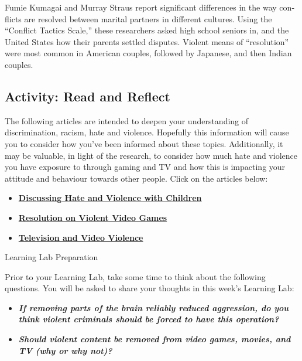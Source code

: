 \documentclass[
]{book}
\providecommand{\tightlist}{%
  \setlength{\itemsep}{0pt}\setlength{\parskip}{0pt}}
\begin{document}
Fumie Kumagai and Murray Straus report significant differences in the way con­flicts are resolved between marital partners in different cultures. Using the ``Conflict Tactics Scale,'' these researchers asked high school seniors in, and the United States how their parents settled disputes. Violent means of ``resolution'' were most common in American couples, followed by Japanese, and then Indian couples.

\hypertarget{activity-read-and-reflect-9}{%
\subsection*{Activity: Read and Reflect}\label{activity-read-and-reflect-9}}

\begin{reflect}
The following articles are intended to deepen your understanding of discrimination, racism, hate and violence. Hopefully this information will cause you to consider how you've been informed about these topics. Additionally, it may be valuable, in light of the research, to consider how much hate and violence you have exposure to through gaming and TV and how this is impacting your attitude and behaviour towards other people. Click on the articles below:

\begin{itemize}
\tightlist
\item
  \href{https://www.adl.org/education/resources/tools-and-strategies/discussing-hate-and-violence-with-children}{\textbf{Discussing Hate and Violence with Children}}\\
\item
  \href{https://www.apa.org/about/policy/violent-video-games}{\textbf{Resolution on Violent Video Games}}\\
\item
  \href{https://www.apa.org/action/resources/research-in-action/protect}{\textbf{Television and Video Violence}}
\end{itemize}

{Learning Lab Preparation}

Prior to your Learning Lab, take some time to think about the following questions. You will be asked to share your thoughts in this week's Learning Lab:

\begin{itemize}
\tightlist
\item
  \textbf{\emph{If removing parts of the brain reliably reduced aggression, do you think violent criminals should be forced to have this operation?}}
\item
  \textbf{\emph{Should violent content be removed from video games, movies, and TV (why or why not)?}}
\end{itemize}
\end{reflect}
\end{document}
